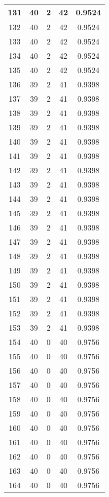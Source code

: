 \documentclass[letterpaper, 12pt]{article}
\begin{document}
\begin{longtable}{|c|c|c|c|c|}
\hline
131 & 40 & 2 & 42 & 0.9524 \\
\hline
132 & 40 & 2 & 42 & 0.9524 \\
\hline
133 & 40 & 2 & 42 & 0.9524 \\
\hline
134 & 40 & 2 & 42 & 0.9524 \\
\hline
135 & 40 & 2 & 42 & 0.9524 \\
\hline
136 & 39 & 2 & 41 & 0.9398 \\
\hline
137 & 39 & 2 & 41 & 0.9398 \\
\hline
138 & 39 & 2 & 41 & 0.9398 \\
\hline
139 & 39 & 2 & 41 & 0.9398 \\
\hline
140 & 39 & 2 & 41 & 0.9398 \\
\hline
141 & 39 & 2 & 41 & 0.9398 \\
\hline
142 & 39 & 2 & 41 & 0.9398 \\
\hline
143 & 39 & 2 & 41 & 0.9398 \\
\hline
144 & 39 & 2 & 41 & 0.9398 \\
\hline
145 & 39 & 2 & 41 & 0.9398 \\
\hline
146 & 39 & 2 & 41 & 0.9398 \\
\hline
147 & 39 & 2 & 41 & 0.9398 \\
\hline
148 & 39 & 2 & 41 & 0.9398 \\
\hline
149 & 39 & 2 & 41 & 0.9398 \\
\hline
150 & 39 & 2 & 41 & 0.9398 \\
\hline
151 & 39 & 2 & 41 & 0.9398 \\
\hline
152 & 39 & 2 & 41 & 0.9398 \\
\hline
153 & 39 & 2 & 41 & 0.9398 \\
\hline
154 & 40 & 0 & 40 & 0.9756 \\
\hline
155 & 40 & 0 & 40 & 0.9756 \\
\hline
156 & 40 & 0 & 40 & 0.9756 \\
\hline
157 & 40 & 0 & 40 & 0.9756 \\
\hline
158 & 40 & 0 & 40 & 0.9756 \\
\hline
159 & 40 & 0 & 40 & 0.9756 \\
\hline
160 & 40 & 0 & 40 & 0.9756 \\
\hline
161 & 40 & 0 & 40 & 0.9756 \\
\hline
162 & 40 & 0 & 40 & 0.9756 \\
\hline
163 & 40 & 0 & 40 & 0.9756 \\
\hline
164 & 40 & 0 & 40 & 0.9756 \\

\end{longtable}
\end{document}
